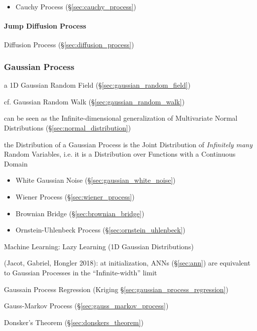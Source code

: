 \begin{itemize}
  \item Cauchy Process (\S\ref{sec:cauchy_process})
\end{itemize}



\paragraph{Jump Diffusion Process}\label{sec:jump_diffusion}\hfill

Diffusion Process (\S\ref{sec:diffusion_process})



\subsubsection{Gaussian Process}\label{sec:gaussian_process}

a 1D Gaussian Random Field (\S\ref{sec:gaussian_random_field})

cf. Gaussian Random Walk (\S\ref{sec:gaussian_random_walk})

can be seen as the Infinite-dimensional generalization of Multivariate Normal
Distributions (\S\ref{sec:normal_distribution})

the Distribution of a Gaussian Process is the Joint Distribution of
\emph{Infinitely many} Random Variables, i.e. it is a Distribution over
Functions with a Continuous Domain

\begin{itemize}
  \item White Gaussian Noise (\S\ref{sec:gaussian_white_noise})
  \item Wiener Process (\S\ref{sec:wiener_process})
  \item Brownian Bridge (\S\ref{sec:brownian_bridge})
  \item Ornstein-Uhlenbeck Process (\S\ref{sec:ornstein_uhlenbeck})
\end{itemize}

Machine Learning: Lazy Learning (1D Gaussian Distributions)

(Jacot, Gabriel, Hongler 2018): at initialization, ANNs (\S\ref{sec:ann}) are
equivalent to Gaussian Processes in the ``Infinite-width'' limit

Gaussain Process Regression (Kriging \S\ref{sec:gaussian_process_regression})

\fist Gauss-Markov Process (\S\ref{sec:gauss_markov_process})

\fist Donsker's Theorem (\S\ref{sec:donskers_theorem})




